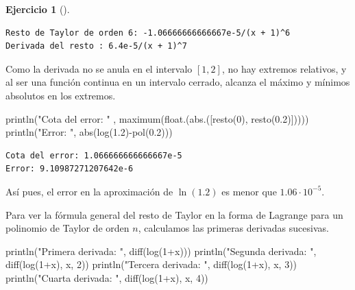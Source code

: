 \documentclass[
  a4paper,
]{scrreport}
\newenvironment{Shaded}{\begin{snugshade}}{\end{snugshade}}
\newcommand{\FloatTok}[1]{\textcolor[rgb]{0.68,0.00,0.00}{#1}}
\newcommand{\FunctionTok}[1]{\textcolor[rgb]{0.28,0.35,0.67}{#1}}
\newcommand{\NormalTok}[1]{\textcolor[rgb]{0.00,0.23,0.31}{#1}}
\newcommand{\OperatorTok}[1]{\textcolor[rgb]{0.37,0.37,0.37}{#1}}
\newcommand{\StringTok}[1]{\textcolor[rgb]{0.13,0.47,0.30}{#1}}
\theoremstyle{definition}
\newtheorem{exercise}{Ejercicio}[chapter]
\theoremstyle{remark}
\begin{document}
\begin{exercise}[]
\begin{tcolorbox}
\begin{verbatim}
Resto de Taylor de orden 6: -1.06666666666667e-5/(x + 1)^6
Derivada del resto : 6.4e-5/(x + 1)^7
\end{verbatim}

Como la derivada no se anula en el intervalo \([1,2]\), no hay extremos
relativos, y al ser una función continua en un intervalo cerrado,
alcanza el máximo y mínimos absolutos en los extremos.

\begin{Shaded}
\begin{Highlighting}[]
\FunctionTok{println}\NormalTok{(}\StringTok{"Cota del error: "}\NormalTok{ , }\FunctionTok{maximum}\NormalTok{(}\FunctionTok{float}\NormalTok{.(}\FunctionTok{abs}\NormalTok{.([}\FunctionTok{resto}\NormalTok{(}\FloatTok{0}\NormalTok{), }\FunctionTok{resto}\NormalTok{(}\FloatTok{0.2}\NormalTok{)])))) }
\FunctionTok{println}\NormalTok{(}\StringTok{"Error: "}\NormalTok{, }\FunctionTok{abs}\NormalTok{(}\FunctionTok{log}\NormalTok{(}\FloatTok{1.2}\NormalTok{)}\FunctionTok{{-}pol}\NormalTok{(}\FloatTok{0.2}\NormalTok{)))}
\end{Highlighting}
\end{Shaded}

\begin{verbatim}
Cota del error: 1.066666666666667e-5
Error: 9.10987271207642e-6
\end{verbatim}

Así pues, el error en la aproximación de \(\ln(1.2)\) es menor que
\(1.06\cdot 10^{-5}\).

Para ver la fórmula general del resto de Taylor en la forma de Lagrange
para un polinomio de Taylor de orden \(n\), calculamos las primeras
derivadas sucesivas.

\begin{Shaded}
\begin{Highlighting}[]
\FunctionTok{println}\NormalTok{(}\StringTok{"Primera derivada: "}\NormalTok{, }\FunctionTok{diff}\NormalTok{(}\FunctionTok{log}\NormalTok{(}\FloatTok{1}\OperatorTok{+}\NormalTok{x)))}
\FunctionTok{println}\NormalTok{(}\StringTok{"Segunda derivada: "}\NormalTok{, }\FunctionTok{diff}\NormalTok{(}\FunctionTok{log}\NormalTok{(}\FloatTok{1}\OperatorTok{+}\NormalTok{x), x, }\FloatTok{2}\NormalTok{))}
\FunctionTok{println}\NormalTok{(}\StringTok{"Tercera derivada: "}\NormalTok{, }\FunctionTok{diff}\NormalTok{(}\FunctionTok{log}\NormalTok{(}\FloatTok{1}\OperatorTok{+}\NormalTok{x), x, }\FloatTok{3}\NormalTok{))}
\FunctionTok{println}\NormalTok{(}\StringTok{"Cuarta derivada: "}\NormalTok{, }\FunctionTok{diff}\NormalTok{(}\FunctionTok{log}\NormalTok{(}\FloatTok{1}\OperatorTok{+}\NormalTok{x), x, }\FloatTok{4}\NormalTok{))}
\end{Highlighting}
\end{Shaded}


\end{tcolorbox}
\end{exercise}
\end{document}
